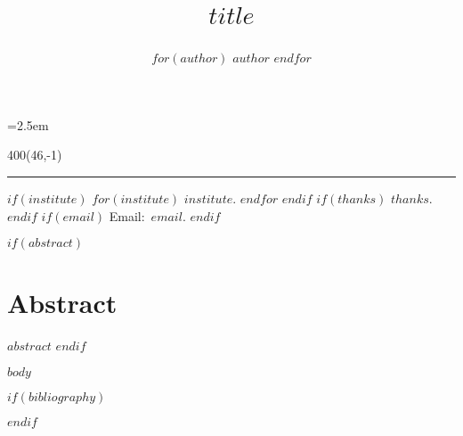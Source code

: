 \documentclass[letterpaper,twocolumn]{article}
\title{%
\vspace{-5ex}%
\begin{minipage}{\textwidth}%
\begin{flushleft}%
{\normalfont\huge $title$}%
\end{flushleft}%
\end{minipage}%
\vspace{-1ex}%
}
\author{%
\begin{minipage}{\textwidth}%
\begin{flushleft}%
\hspace{-0.5em}%
{\normalfont\large $for(author)$ $author$ \quad $endfor$}%
\end{flushleft}%
\end{minipage}%
}
\date{}
\begin{document}
\nowidow[2]
\parindent=2.5em

\maketitle
\thispagestyle{fancy}

\textblockorigin{0in}{11in}
\setlength{\TPHorizModule}{1pt}
\setlength{\TPVertModule}{1in}
\begin{textblock}{400}(46,-1)
    \parindent=0pt
    \normalfont\scriptsize\raggedright

    \hrule
    \vspace{1.5ex}

    $if(institute)$ $for(institute)$ $institute$. $endfor$ $endif$
    $if(thanks)$ $thanks$. $endif$
    $if(email)$ \phantom{*}Email:~\texttt{$email$}. $endif$
\end{textblock}

$if(abstract)$
\section*{Abstract}
$abstract$
$endif$

$body$

$if(bibliography)$
\footnotesize


$endif$
\end{document}
